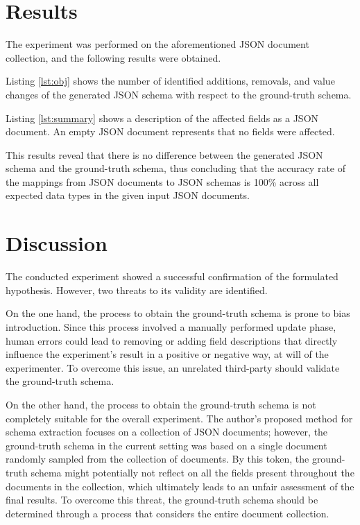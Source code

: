 \documentclass[sigconf, nonacm]{acmart}
\begin{document}
\section{Results}

The experiment was performed on the aforementioned JSON document collection, and the following results were obtained.

Listing \ref{lst:obj} shows the number of identified additions, removals, and value changes of the generated JSON schema with respect to the ground-truth schema.



Listing \ref{lst:summary} shows a description of the affected fields as a JSON document. An empty JSON document represents that no fields were affected.



This results reveal that there is no difference between the generated JSON schema and the ground-truth schema, thus concluding that the accuracy rate of the mappings from JSON documents to JSON schemas is 100\% across all expected data types in the given input JSON documents.

\section{Discussion}

The conducted experiment showed a successful confirmation of the formulated hypothesis. However, two threats to its validity are identified.

On the one hand, the process to obtain the ground-truth schema is prone to bias introduction. Since this process involved a manually performed update phase, human errors could lead to removing or adding field descriptions that directly influence the experiment's result in a positive or negative way, at will of the experimenter. To overcome this issue, an unrelated third-party should validate the ground-truth schema.

On the other hand, the process to obtain the ground-truth schema is not completely suitable for the overall experiment. The author's proposed method for schema extraction focuses on a collection of JSON documents; however, the ground-truth schema in the current setting was based on a single document randomly sampled from the collection of documents. By this token, the ground-truth schema might potentially not reflect on all the fields present throughout the documents in the collection, which ultimately leads to an unfair assessment of the final results. To overcome this threat, the ground-truth schema should be determined through a process that considers the entire document collection.
\end{document}
